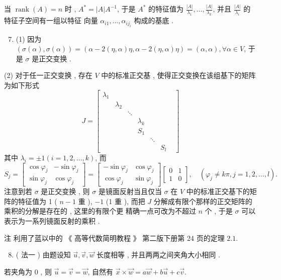 \documentclass[10pt]{article}
\begin{document}
 当  $\operatorname{rank}(A)=n$  时 , $A^{*}=|A| A^{-1}$,  于是  $A^{*}$  的特征值为  $\frac{|A|}{\lambda_{1}}, \ldots, \frac{|A|}{\lambda_{k}}$,  并且  $\frac{|A|}{\lambda_{i}}$  的特征子空间有一组以特征   向量  $\alpha_{i 1}, \ldots, \alpha_{i j_{i}}$  构成的基底 .

\begin{enumerate}
  \setcounter{enumi}{6}
  \item (1)  因为  $(\sigma(\alpha), \sigma(\alpha))=(\alpha-2(\eta, \alpha) \eta, \alpha-2(\eta, \alpha) \eta)=(\alpha, \alpha), \forall \alpha \in V$,  于是  $\sigma$  是正交变换 .
\end{enumerate}
(2)  对于任一正交变换 ,  存在  $V$  中的标准正交基 ,  使得正交变换在该组基下的矩阵为如下形式 
$$
J=\left[\begin{array}{ccccccc}
\lambda_{1} & & & & & & \\
& \lambda_{2} & & & & & \\
& & \ddots & & & & \\
& & & \lambda_{k} & & & \\
& & & S_{1} & & \\
& & & & \ddots & \\
& & & & & S_{l}
\end{array}\right]
$$
 其中  $\lambda_{i}=\pm 1(i=1,2, \ldots, k)$,  而 
$$
S_{j}=\left[\begin{array}{cc}
\cos \varphi_{j} & -\sin \varphi_{j} \\
\sin \varphi_{j} & \cos \varphi_{j}
\end{array}\right]=\left[\begin{array}{cc}
-\sin \varphi_{j} & \cos \varphi_{j} \\
\cos \varphi_{j} & \sin \varphi_{j}
\end{array}\right]\left[\begin{array}{ll}
0 & 1 \\
1 & 0
\end{array}\right], \quad\left(\varphi_{j} \neq k \pi, j=1,2, \ldots, l\right) .
$$
 注意到若  $\sigma$  是正交变换 ,  则  $\sigma$  是镜面反射当且仅当  $\sigma$  在  $V$  中的标准正交基下的矩阵的特征值为  1 ( $n-1$  重 ), $-1$ (1  重 ),  而把  $J$  分解成有限个那样的正交矩阵的乘积的分解是存在的 ,  这里的有限个更   精确一点可改为不超过  $n$  个 ,  于是  $\sigma$  可以表示为一系列镜面反射的乘积 .

 注   利用了蓝以中的  《 高等代数简明教程 》 第二版下册第  24  页的定理  $2.1$.

\begin{enumerate}
  \setcounter{enumi}{7}
  \item ( 法一 )  由题设知  $\vec{u}, \vec{v}, \vec{w}$  长度相等 ,  并且两两之间夹角大小相同 .
\end{enumerate}
 若夹角为  0 ,  则  $\vec{u}=\vec{v}=\vec{w}$,  自然有  $\vec{x} \times \vec{w}=a \vec{w}+b \vec{u}+c \vec{v}$.
\end{document}
